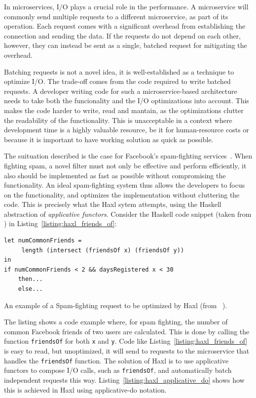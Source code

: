 In microservices, \ac{I/O} plays a crucial role in the performance.
A microservice will commonly send multiple requests to a different microservice, as part of its operation.
Each request comes with a significant overhead from establishing the connection and sending the data.
If the requests do not depend on each other, however, they can instead be sent as a single, batched request for mitigating the overhead.

Batching requests is not a novel idea, it is well-established as a technique to optimize \ac{I/O}.
The trade-off comes from the code required to write batched requests.
A developer writing code for such a microservice-based architecture needs to take both the funcionality and the \ac{I/O} optimizations into account.
This makes the code harder to write, read and mantain, as the optimizations clutter the readability of the functionality.
This is unacceptable in a context where development time is a highly valuable resource, be it for human-resource costs or because it is important to have working solution as quick as possible. 

The suituation described is the case for Facebook's spam-fighting services~\cite{marlow2014haxl}.
When fighting spam, a novel filter must not only be effective and perform efficiently, it also should be implemented as fast as possible without compromising the functionality.
An ideal spam-fighting system thus allows the developers to focus on the functionality, and optimizes the implementation without cluttering the code.
This is precisely what the Haxl sytem attempts, using the Haskell abstraction of \emph{applicative functors}.
Consider the Haskell code snippet (taken from \cite{marlow2014haxl}) in Listing~\ref{listing:haxl_friends_of}:

\begin{listing}[h]
\begin{verbatim}
let numCommonFriends =
     length (intersect (friendsOf x) (friendsOf y))
in
if numCommonFriends < 2 && daysRegistered x < 30
    then...
    else...
\end{verbatim}
\caption{An example of a Spam-fighting request to be optimized by Haxl (from ~\cite{marlow2014haxl}).}
\label{listing:haxl_friends_of}
\end{listing}

The listing shows a code example where, for spam fighting, the number of common Facebook friends of two users are calculated.
This is done by calling the function \texttt{friendsOf} for both \texttt{x} and \texttt{y}.
Code like Listing~\ref{listing:haxl_friends_of} is easy to read, but unoptimized, it will send to requests to the microservice that handles the \texttt{friendsOf} function.
The solution of Haxl is to use applicative functors to compose \ac{I/O} calls, such as \texttt{friendsOf}, and automatically batch independent requests this way.
Listing~\ref{listing:haxl_applicative_do} shows how this is achieved in Haxl using applicative-do notation.

